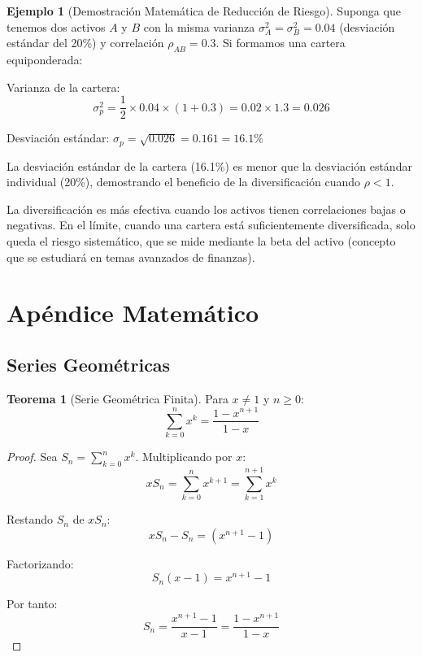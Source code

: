 \documentclass[12pt,a4paper]{article}
\theoremstyle{definition}
\newtheorem{teorema}{Teorema}[section]
\newtheorem{ejemplo}{Ejemplo}[section]
\begin{document}
\begin{ejemplo}[Demostración Matemática de Reducción de Riesgo]
Suponga que tenemos dos activos $A$ y $B$ con la misma varianza $\sigma_A^2 = \sigma_B^2 = 0.04$ (desviación estándar del 20\%) y correlación $\rho_{AB} = 0.3$. Si formamos una cartera equiponderada:

Varianza de la cartera:
$$\sigma_p^2 = \frac{1}{2} \times 0.04 \times (1 + 0.3) = 0.02 \times 1.3 = 0.026$$

Desviación estándar: $\sigma_p = \sqrt{0.026} = 0.161 = 16.1\%$

La desviación estándar de la cartera (16.1\%) es menor que la desviación estándar individual (20\%), demostrando el beneficio de la diversificación cuando $\rho < 1$.
\end{ejemplo}

La diversificación es más efectiva cuando los activos tienen correlaciones bajas o negativas. En el límite, cuando una cartera está suficientemente diversificada, solo queda el riesgo sistemático, que se mide mediante la beta del activo (concepto que se estudiará en temas avanzados de finanzas).

\appendix

\section{Apéndice Matemático}

\subsection{Series Geométricas}

\begin{teorema}[Serie Geométrica Finita]
Para $x \neq 1$ y $n \geq 0$:
\begin{equation}
\sum_{k=0}^{n} x^k = \frac{1 - x^{n+1}}{1 - x}
\end{equation}
\end{teorema}

\begin{proof}
Sea $S_n = \sum_{k=0}^{n} x^k$. Multiplicando por $x$:
$$xS_n = \sum_{k=0}^{n} x^{k+1} = \sum_{k=1}^{n+1} x^k$$

Restando $S_n$ de $xS_n$:
$$xS_n - S_n = (x^{n+1} - 1)$$

Factorizando:
$$S_n(x - 1) = x^{n+1} - 1$$

Por tanto:
$$S_n = \frac{x^{n+1} - 1}{x - 1} = \frac{1 - x^{n+1}}{1 - x}$$
\end{proof}
\end{document}
